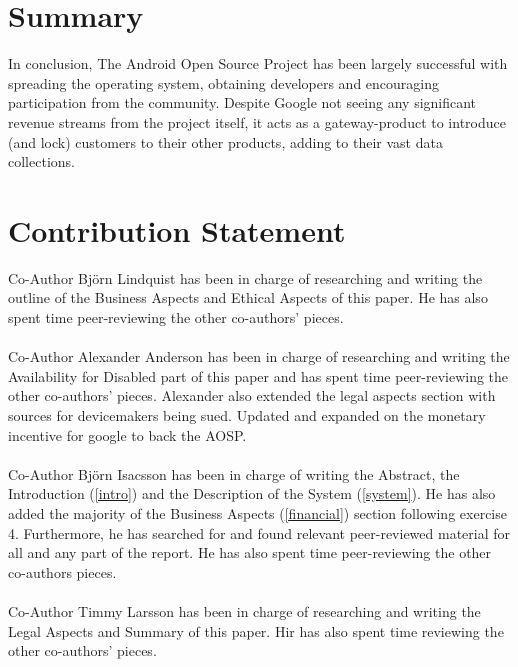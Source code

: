 \documentclass[conference]{IEEEtran}
\begin{document}
\section{Summary}
\label{summary}

In conclusion, The Android Open Source Project has been largely successful with spreading the operating system, obtaining developers and encouraging participation from the community. Despite Google not seeing any significant revenue streams from the project itself, it acts as a gateway-product to introduce (and lock) customers to their other products, adding to their vast data collections.


\section{Contribution Statement}
\label{contribution}

Co-Author Björn Lindquist has been in charge of researching and writing the outline of the Business Aspects and Ethical Aspects of this paper. He has also spent time peer-reviewing the other co-authors' pieces.
\\
\\
Co-Author Alexander Anderson has been in charge of researching and writing the Availability for Disabled part of this paper and has spent time peer-reviewing the other co-authors' pieces. Alexander also extended the legal aspects section with sources for devicemakers being sued. Updated and expanded on the monetary incentive for google to back the AOSP.
\\
\\
Co-Author Björn Isacsson has been in charge of writing the Abstract, the Introduction (\ref{intro}) and the Description of the System (\ref{system}). He has also added the majority of the Business Aspects (\ref{financial}) section following exercise 4. Furthermore, he has searched for and found relevant peer-reviewed material for all and any part of the report. He has also spent time peer-reviewing the other co-authors pieces. 
\\
\\
Co-Author Timmy Larsson has been in charge of researching and writing the Legal Aspects and Summary of this paper. Hir has also spent time reviewing the other co-authors' pieces.
\end{document}
